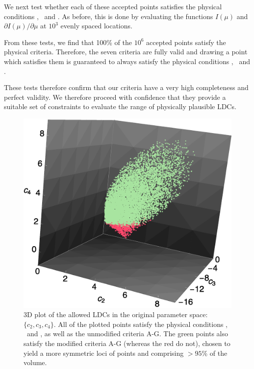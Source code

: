 We next test whether each of these accepted points satisfies the physical
conditions \I, \II\ and \III. As before, this is done by evaluating the 
functions $I(\mu)$ and $\partial I(\mu)/\partial\mu$ at $10^3$ evenly spaced 
locations.

From these tests, we find that 100\% of the $10^6$ accepted points satisfy the
physical criteria. Therefore, the seven criteria are fully valid and drawing
a point which satisfies them is guaranteed to always satisfy the physical 
conditions \I, \II\ and \III.

These tests therefore confirm that our criteria have a very high completeness
and perfect validity. We therefore proceed with confidence that
they provide a suitable set of constraints to evaluate the range of physically
plausible LDCs.

\begin{figure}
\includegraphics[width=\columnwidth]{c3Dplot.eps}
\caption{
3D plot of the allowed LDCs in the original parameter space: $\{c_2,c_3,c_4\}$. 
All of the plotted points satisfy the physical conditions \I, \II\ and \III,
as well as the unmodified criteria A-G. The green points also satisfy the 
modified criteria A-G (whereas the red do not), chosen to yield a more symmetric 
loci of points and comprising $>95$\% of the volume.
}
\label{fig:c3Dplot}
\end{figure}

